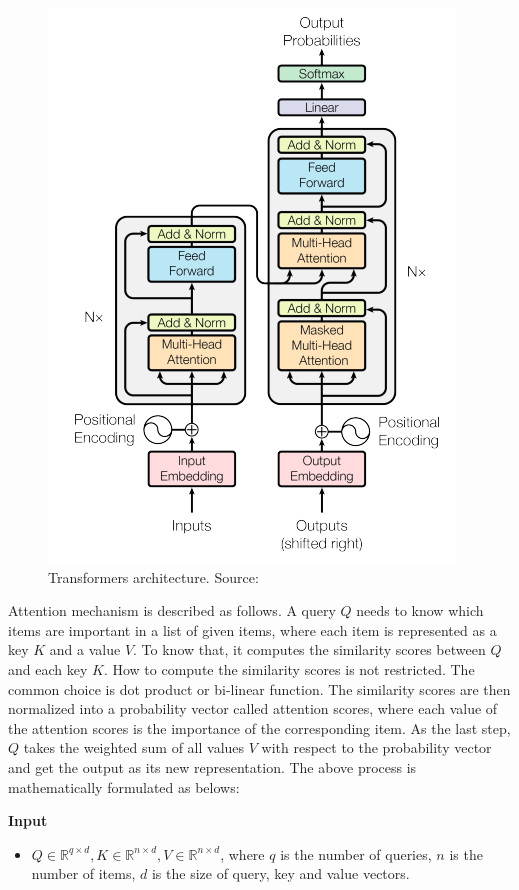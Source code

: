 \documentclass[12pt, sort&compress]{report}
\begin{document}
\begin{figure}[!htbp]
	\centering
	\includegraphics[scale=.7]{images/transformers.png}
	\caption{Transformers architecture. Source: \cite{vaswani2017attention}}
	\label{fig:2:04}
\end{figure}
\par Attention mechanism is described as follows. A query $Q$ needs to know which items are important in a list of given items, where each item is represented as a key $K$ and a value $V$. To know that, it computes the similarity scores between $Q$ and each key $K$. How to compute the similarity scores is not restricted. The common choice is dot product or bi-linear function. The similarity scores are then normalized into a probability vector called attention scores, where each value of the attention scores is the importance of the corresponding item. As the last step, $Q$ takes the weighted sum of all values $V$ with respect to the probability vector and get the output as its new representation. The above process is mathematically formulated as belows:
\par \textbf{Input}
\begin{itemize}
	\item $Q \in \mathbb{R}^{q \times d}, K \in \mathbb{R}^{n \times d}, V \in \mathbb{R}^{n \times d}$, where $q$ is the number of queries, $n$ is the number of items, $d$ is the size of query, key and value vectors.
\end{itemize}
\end{document}
